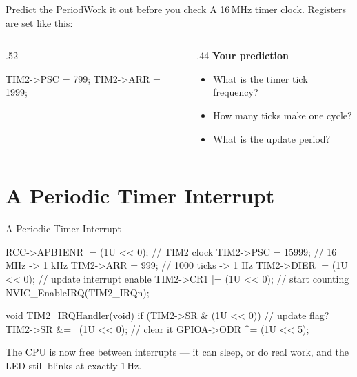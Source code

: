 \documentclass[9pt,aspectratio=169,xcolor=table]{beamer}
\begin{document}
{\beamerextras
\begin{frame}[fragile]{Predict the Period}{Work it out before you check}
    \leavevmode
    A 16\,MHz timer clock. Registers are set like this:

    \vspace{2mm}
    \begin{columns}[T]
    \begin{column}{.52\textwidth}
\begin{cc}[basicstyle=\ttfamily\small]
TIM2->PSC = 799;
TIM2->ARR = 1999;
\end{cc}
    \end{column}
    \begin{column}{.44\textwidth}
        \textbf{Your prediction}
        {\small
        \begin{itemize}\itemsep2pt
            \item What is the timer tick frequency?
            \item How many ticks make one cycle?
            \item What is the update period?
        \end{itemize}}
    \end{column}
    \end{columns}

    \vspace{2mm}
\end{frame}
}


\section{A Periodic Timer Interrupt}

\begin{frame}[fragile]{A Periodic Timer Interrupt}
\begin{cc}[basicstyle=\ttfamily\small]
RCC->APB1ENR |= (1U << 0);      // TIM2 clock
TIM2->PSC = 15999;              // 16 MHz -> 1 kHz
TIM2->ARR = 999;                // 1000 ticks -> 1 Hz
TIM2->DIER |= (1U << 0);        // update interrupt enable
TIM2->CR1  |= (1U << 0);        // start counting
NVIC_EnableIRQ(TIM2_IRQn);

void TIM2_IRQHandler(void)
{
    if (TIM2->SR & (1U << 0)) { // update flag?
        TIM2->SR &= ~(1U << 0); // clear it
        GPIOA->ODR ^= (1U << 5);
    }
}
\end{cc}

    \vspace{2mm}
    {\small The CPU is now \alert{free} between interrupts --- it can sleep, or do
    real work, and the LED still blinks at exactly 1\,Hz.}
\end{frame}
\end{document}
